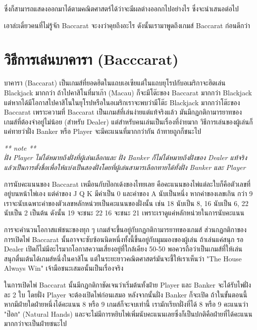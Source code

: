 \documentclass[12pt]{article}
\begin{document}
ซึ่งก็สามารถแสดงออกมาได้ตามคณิตศาสตร์ได้ว่าจะมีผลต่างออกกไปอย่างไร ซึ่งจะนำเสนอต่อไป

เอาล่ะเดี๋ยวคนที่ไม่รู้จัก Baccarat จะงงว่าคุยถึงอะไร ดังนั้นเรามาพูดถึงเกมส์ Baccarat ก่อนดีกว่า 


\newpage
\section{วิธีการเล่นบาคารา (Bacccarat)}
บาคารา (Baccarat) เป็นเกมส์ที่ยอดฮิตในแถบเอเซียแต่ในแถบยุโรปกับอเมริกาจะฮิตเล่น Blackjack มากกว่า ถ้าไปคาสิโนที่มาเก๊า (Macau) ก็จะมีโต๊ะของ Baccarat มากกว่า Blackjack แต่หากได้มีโอกาสไปคาสิโนในยุโรปหรือในอเมริกเราจะพบว่ามีโต๊ะ Blackjack มากกว่าโต๊ะของ Baccarat เพราะความที่ Baccarat เป็นเกมส์ที่เล่นง่ายแต่แท้จริงแล้ว มันมีกฏกติกามารยาทของเกมส์ที่ต้องจำอยู่ไม่น้อย (สำหรับ Dealer) แต่สำหรับคนเล่นเป็นเรื่องที่ง่ายมาก วิธีการเล่นของผู้เล่นก็แค่ทายว่าฝั่ง Banker หรือ Player จะมีคะแนนที่มากกว่ากัน ถ้าทายถูกก็ชนะไป 
\begin{center}
\emph{** note **}\\
\textit{ฝั่ง Player ไม่ได้หมายถึงฝั่งที่ผู้เล่นเลือกและ ฝั่ง Banker ก็ไม่ได้หมายถึงฝั่งของ Dealer แท้จริงแล้วเป็นการตั้งชื่อเพื่อให้แบ่งเป็นสองฝั่งโดยที่ผู้เล่นสามารเลือกทายได้ทั้งฝั่ง Banker และ Player}
\end{center}

การนับคะแนนของ Baccarat เหมือนกับป๊อกเด้งของไทยเลย คือคะแนนของไพ่แต่ละใบก็คือตัวเลขที่อยู่บนหน้าไพ่เอง แต่ค่าของ J Q K มีค่าเป็น 0 และค่าของ A นับเป็นหนึ่ง หากค่าของเลขเกิน กว่า 9 เราจะนับเฉพาะค่าของตัวเลขหลักหน่วยเป็นคะแนนของฝั่งนั้น เช่น 18 นับเป็น 8, 16 นับเป็น 6, 22 นับเป็น 2 เป็นต้น ดังนั้น 19 จะชนะ 22 16  จะชนะ 21 เพราะเราดูแค่หลักหน่วยในการนับคะแนน 

การจะคำนวนโอกาสแพ้ชนะของทุก ๆ เกมส์จะขึ้นอยู่กับกฏกติกามารยาทของเกมส์ ส่วนกฏกติกาของการเปิดไพ่ Baccarat นั้นอาจจะซับซ้อนนิดหนึ่งทั้งนี้ขึ้นอยู่กับมุมมองของผู้เล่น ถ้าเล่นแค่สนุก รอ Dealer เปิดก็ไม่มีอะไรมากโอกาสความเสี่ยงอยู่ที่ใกล้เคียง 50-50 พอควรถือว่าเป็นเกมส์ที่ให้เล่นสนุกตื่นเต้นได้เกมส์หนึ่งในคาสิโน แต่ในระยะยาวคณิตศาสตร์มันจะชี้ให้เราเห็นว่า "The House Always Win" เจ้ามือชนะเสมอนั้นเป็นเรื่องจริง

ในการเปิดไพ่ Baccarat นั้นมีกฏกติกาชัดเจนว่าเริ่มต้นทั้งฝ่าย Player และ Banker จะได้รับไพ่ฝั่งละ 2 ใบ โดยฝั่ง Player จะต้องเปิดไพ่ก่อนเสมอ หลังจากนั้นฝั่ง Banker ก็จะเปิด ถ้าในขั้นตอนนี้หากมีฝ่ายใดฝ่ายหนึ่งได้คะแนน 8 หรือ 9 เกมส์ก็จะจบเท่านี้ เรามักเรียกฝั่งที่ได้ 8 หรือ 9 คะแนนว่า "ป๊อก" (Natural Hands) และจะไม่มีการหยิบไพ่เพิ่มนับคะแนนเลยซึ่งก็เป็นปกติคือฝ่ายที่ได้คะแนนมากกว่าจะเป็นฝ่ายชนะไป 
\end{document}
